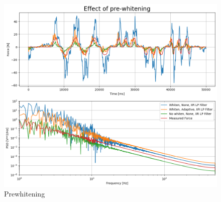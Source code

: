 \begin{figure}[h!t]
	\begin{center}
		\includegraphics[width=1.0\columnwidth]{images/measurement_prewhitening.png}
	\end{center}
	\caption{Prewhitening}
	\label{fig:result_prewhitening}
\end{figure}

